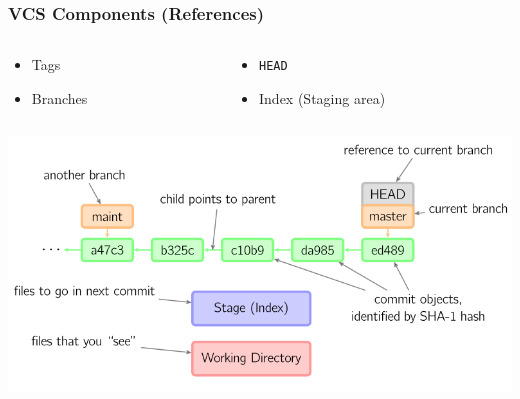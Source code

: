 \documentclass[english,compress]{beamer}
\newcommand{\cw}{\texttt} %
\begin{document}
\frame
{
    \frametitle{VCS Components (References)}

    \begin{columns}
        \begin{column}{.5\textwidth}
    \begin{itemize}
        \item Tags
        \item Branches
    \end{itemize}
\end{column}
\begin{column}{.5\textwidth}
    \begin{itemize}
        \item \cw{HEAD}
        \item Index (Staging area)
    \end{itemize}
\end{column}
\end{columns}
\begin{center}
    \includegraphics[width=\textwidth]{figs/visual-git.png}\cite{visual-git}
\end{center}
}
\end{document}

